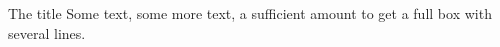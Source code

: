 \documentclass{article}
\begin{document}
\begin{thmbox}[L]{The title}
Some text, some more text, a
sufficient amount to get a
full box with several lines.
\end{thmbox}
\end{document}
